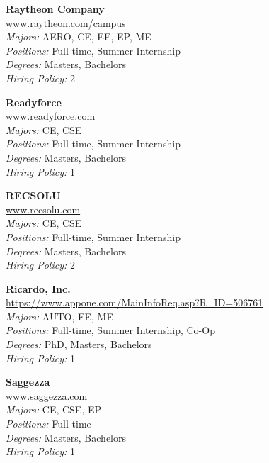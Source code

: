 \documentclass{article}
\begin{document}
\begin{center}
\begin{multicols}{3}
\begin{minipage}{.9\columnwidth}{\Large\bf Raytheon Company }\\
	\url{www.raytheon.com/campus}\\
	\emph{Majors:} AERO, CE, EE, EP, ME\\
	\emph{Positions:} Full-time, Summer Internship\\
	\emph{Degrees:} Masters, Bachelors\\
	\emph{Hiring Policy:} 2\\
\end{minipage}
 
\begin{minipage}{.9\columnwidth}{\Large\bf Readyforce }\\
	\url{www.readyforce.com}\\
	\emph{Majors:} CE, CSE\\
	\emph{Positions:} Full-time, Summer Internship\\
	\emph{Degrees:} Masters, Bachelors\\
	\emph{Hiring Policy:} 1\\
\end{minipage}
 
\begin{minipage}{.9\columnwidth}{\Large\bf RECSOLU }\\
	\url{www.recsolu.com}\\
	\emph{Majors:} CE, CSE\\
	\emph{Positions:} Full-time, Summer Internship\\
	\emph{Degrees:} Masters, Bachelors\\
	\emph{Hiring Policy:} 2\\
\end{minipage}
 
\begin{minipage}{.9\columnwidth}{\Large\bf Ricardo, Inc. }\\
	\url{https://www.appone.com/MainInfoReq.asp?R_ID=506761}\\
	\emph{Majors:} AUTO, EE, ME\\
	\emph{Positions:} Full-time, Summer Internship, Co-Op\\
	\emph{Degrees:} PhD, Masters, Bachelors\\
	\emph{Hiring Policy:} 1\\
\end{minipage}
 
\begin{minipage}{.9\columnwidth}{\Large\bf Saggezza }\\
	\url{www.saggezza.com}\\
	\emph{Majors:} CE, CSE, EP\\
	\emph{Positions:} Full-time\\
	\emph{Degrees:} Masters, Bachelors\\
	\emph{Hiring Policy:} 1\\
\end{minipage}
 

\end{multicols}
\end{center}
\end{document}
